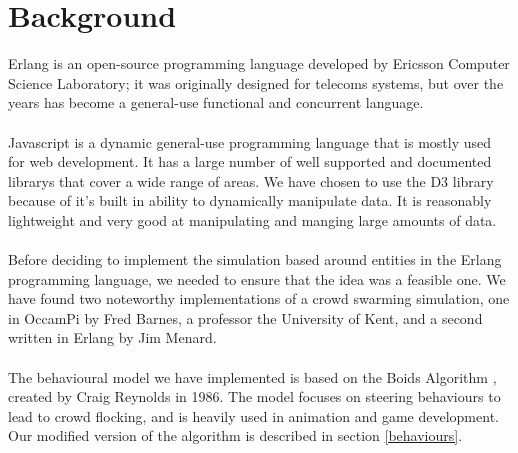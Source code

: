 \documentclass[10pt, a4paper, conference, compsocconf]{IEEEtran}
\begin{document}
\section{Background \label{background}}
Erlang is an open-source programming language developed by Ericsson Computer Science Laboratory; it was originally designed for telecoms systems, but over the years has become a general-use functional and concurrent language.\\
\\
Javascript is a dynamic general-use programming language that is mostly used for web development. It has a large number of well supported and documented librarys that cover a wide range of areas. We have chosen to use the D3\cite{d3} library because of it's built in ability to dynamically manipulate data. It is reasonably lightweight and very good at manipulating and manging large amounts of data.\\
\\%
Before deciding to implement the simulation based around entities in the Erlang programming language, we needed to ensure that the idea was a feasible one. We have found two noteworthy implementations of a crowd swarming simulation, one in OccamPi by Fred Barnes\cite{occam_boids}, a professor the University of Kent, and a second written in Erlang by Jim Menard\cite{erlang_boids}.\\
\\%
The behavioural model we have implemented is based on the Boids Algorithm \cite{boids}, created by Craig Reynolds in 1986. The model focuses on steering behaviours to lead to crowd flocking, and is heavily used in animation and game development. Our modified version of the algorithm is described in section \ref{behaviours}.\\
\\
\end{document}
